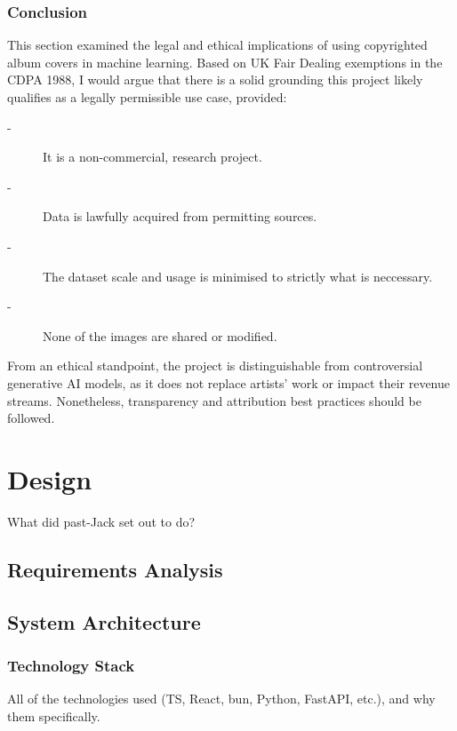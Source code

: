               \subsubsection{Conclusion}
    
                  This section examined the legal and ethical implications of using copyrighted album covers in machine learning. Based on UK Fair Dealing exemptions in the CDPA 1988, I would argue that there is a solid grounding this project likely qualifies as a legally permissible use case, provided:
                  \begin{description}
                      \item[-] It is a non-commercial, research project.
                      \item[-] Data is lawfully acquired from permitting sources.
                      \item[-] The dataset scale and usage is minimised to strictly what is neccessary.
                      \item[-] None of the images are shared or modified. %
                  \end{description}
                  
                  From an ethical standpoint, the project is distinguishable from controversial generative AI models, as it does not replace artists’ work or impact their revenue streams. Nonetheless, transparency and attribution best practices should be followed.
    
    \section{Design} %
      What did past-Jack set out to do?
    
      \subsection{Requirements Analysis}
    
      \subsection{System Architecture} %
          \subsubsection{Technology Stack}
              All of the technologies used (TS, React, bun, Python, FastAPI, etc.), and why them specifically.
    
